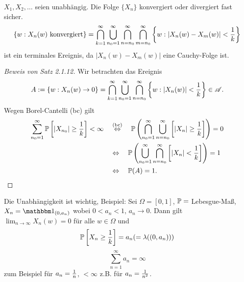 \begin{exmp*}
  $X_1, X_2, \ldots$ seien unabhängig. Die Folge $\{ X_n \}$ konvergiert oder
  divergiert fast sicher.
  \[ \{ w : X_n(w) \text{ konvergiert} \} =
    \bigcap_{k=1}^\infty \bigcup_{n_0=1}^\infty \bigcap_{n=n_0}^\infty
    \bigcap_{m=n_0}^\infty
    \left\{ w : | X_n(w) - X_m(w) | < \frac{1}{k} \right\} \]
  ist ein terminales Ereignis, da $| X_n(w) - X_m(w) |$ eine Cauchy-Folge ist.
\end{exmp*}

\begin{proof}[Beweis von Satz 2.1.12]
  Wir betrachten das Ereignis
  \[ A := \{ w : X_n(w) \to 0 \} =
    \bigcap_{k=1}^\infty \bigcup_{n_0=1}^\infty \bigcap_{n=n_0}^\infty
    \left\{ w : | X_n(w) | < \frac{1}{k} \right\} \in \mathscr{A}. \]
  Wegen Borel-Cantelli (bc) gilt
  \begin{align*}
    \sum_{n_0 = 1}^\infty \mathbb{P}\left[ |X_{n_0}| \ge \frac{1}{k} \right] < \infty
    &\quad \overset{\text{(bc)}}{\Leftrightarrow} \quad
    \mathbb{P} \left( \bigcap_{n_0=1}^\infty \bigcup_{n=n_0}^\infty \left[ |X_n| \ge
        \frac{1}{k} \right]  \right) = 0 \\
    &\quad \Leftrightarrow \quad 
    \mathbb{P} \left( \bigcup_{n_0=1}^\infty \bigcap_{n=n_0}^\infty \left[ |X_n| <
        \frac{1}{k} \right]  \right) = 1 \\
    &\quad \Leftrightarrow \quad \mathbb{P}(A) = 1.
    \qedhere
  \end{align*}
\end{proof}

\begin{rmrk*}
  Die Unabhängigkeit ist wichtig, Beispiel: Sei $\Omega = [0,1]$, $\mathbb{P} = $
  Lebesgue-Maß, $X_n = \ind_{(0,a_n)}$ wobei $0 < a_n < 1$, $a_n \to 0$. Dann
  gilt $\lim_{n \to \infty} X_n(w) = 0$ für alle $w \in \Omega$ und
  \[ \mathbb{P} \left[  X_n \ge \frac{1}{k} \right] = a_n ( = \lambda( (0,a_n)) ) \]
  \[ \sum_{n=1}^\infty a_n = \infty \]
  zum Beispiel für $a_n = \frac{1}{n}$, $< \infty$ z.B. für $a_n = \frac{1}{n^2}$.
\end{rmrk*}

